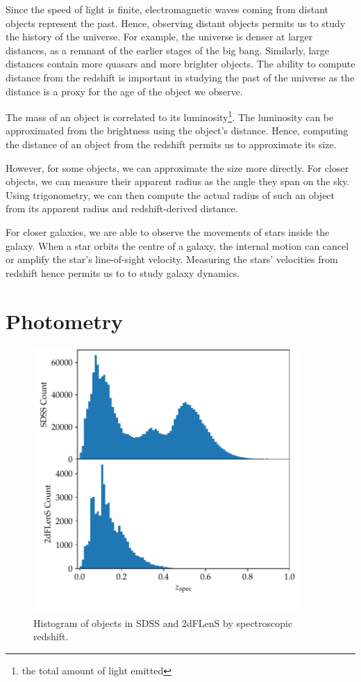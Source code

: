 \documentclass[11pt,twoside]{report}
\begin{document}
  Since the speed of light is finite, electromagnetic waves coming from distant objects represent the past. Hence, observing distant objects permits us to study the history of the universe. For example, the universe is denser at larger distances, as a remnant of the earlier stages of the big bang. Similarly, large distances contain more quasars and more brighter objects. The ability to compute distance from the redshift is important in studying the past of the universe as the distance is a proxy for the age of the object we observe.

  The mass of an object is correlated to its luminosity\footnote{the total amount of light emitted}. The luminosity can be approximated from the brightness using the object's distance. Hence, computing the distance of an object from the redshift permits us to approximate its size.

  However, for some objects, we can approximate the size more directly. For closer objects, we can measure their apparent radius as the angle they span on the sky. Using trigonometry, we can then compute the actual radius of such an object from its apparent radius and redshift-derived distance.

  For closer galaxies, we are able to observe the movements of stars inside the galaxy. When a star orbits the centre of a galaxy, the internal motion can cancel or amplify the star's line-of-sight velocity. Measuring the stars' velocities from redshift hence permits us to to study galaxy dynamics.

\chapter{Photometry}

  \begin{figure}
    \centering
    \includegraphics[width=0.9\textwidth]{zpec_hist.pdf}
    \caption{Histogram of objects in SDSS and 2dFLenS by spectroscopic redshift.}
    \label{fig:spec_hist}
  \end{figure}
\end{document}
